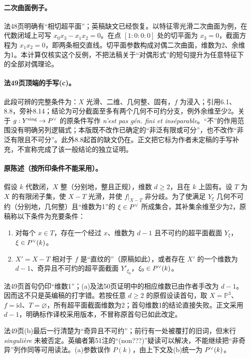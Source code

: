 \paragraph{二次曲面例子。}
法48页明确有“相切超平面”；英稿缺文已经恢复。以特征零光滑二次曲面为例，在代数闭域上可写 $x_0x_3-x_1x_2=0$。在点 $[1:0:0:0]$ 处的切平面为 $x_3=0$，截面方程为 $x_1x_2=0$，即两条相交直线。切平面参数构成对偶二次曲面，维数为2、余维为1。本计算仅核实这个反例，不把法稿关于“对偶形式”的短句提升为任意特征下的全部对偶理论。

\paragraph{法49页顶端的手写(c)。}
此段可辨的完整条件为：$X$ 光滑、二维、几何整、固有，$f$ 为浸入；引用6.1、8.8，旁补8.14；结论为可分截面至多有两个几何不可约分支，例外余维至少2。关于 $g:Y^{\mathrm{sing}}\to P^\vee$ 的原条件写作 \emph{n'est pas gén. fini et inséparable}。“不”的作用范围没有明确另列逻辑式；本版既不改作已确定的“非泛有限或可分”，也不改作“非泛有限且不可分”。此外8.8起首的缺文仍在。正文把它标为作者未定稿的手写补充，不宣称完成了该一般结论的独立证明。

\paragraph{原陈述（按所印条件不能采用）。}
假设 $k$ 代数闭，$X$ 整（分别地，整且正规），维数 $d\ge2$，且在 $k$ 上固有。设 $T$ 为 $X$ 的有限闭子集，使 $X-T$ 光滑，并使 $f|_{X-T}$ 非分歧。为了使满足 $Y_\xi$ 几何不可约（分别地，几何整）且“维数为1”的 $\xi\in P^\vee$ 所成集合，其补集余维至少为2，原稿称以下条件为充要条件：
\begin{enumerate}
\item[(a)] 对每个 $x\in T$，存在一个经过 $x$、维数为 $d-1$ 且不可约的超平面截面 $Y_\xi$，$\xi\in P^\vee(k)$。
\item[(b)] $X'=X-T$ 相对于 $f$ 是“直纹的”（原稿如此），或者存在 $X'$ 的一个维数为 $d-1$、奇异且不可约的超平面截面 $Y'_{\xi_0}$，$\xi_0\in P^\vee(k)$。
\end{enumerate}

法49页首句仍印“维数1”；(a)及法50页证明中的相应维数已由作者手改为 $d-1$。因而这不只是英编稿的打字错。若按任意 $d\ge2$ 的原假设读首句，取 $X=\mathbb P^3$、$f=\mathrm{id}$、$T=\varnothing$，所有超平面截面维数为2；首句维数1的结论直接失败。正文采用 $d-1$，明确标作译校采用版本，不冒称原首句已如此改定。

法49页(b)最后一行清楚为“奇异且不可约”；前行有一处被覆打的旧词，但末行 \emph{singulière} 未被否定。英编者第51注的“(non???)”疑读可以解决，不能继续把“非奇异”列作同等可用读法。(a)参数误作 $P(k)$，由上下文及(b)统一为 $P^\vee(k)$。

